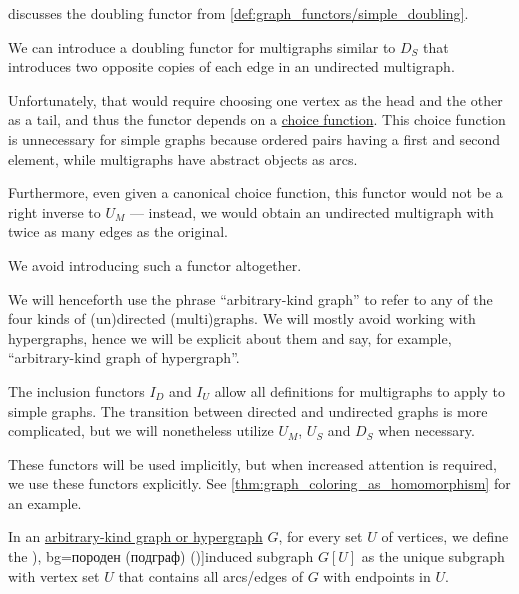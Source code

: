 \begin{comments}
  \item {} discusses the doubling functor from \cref{def:graph_functors/simple_doubling}.
  \item We can introduce a doubling functor for multigraphs similar to \hyperref[def:graph_functors/simple_doubling]{\( D_S \)} that introduces two opposite copies of each edge in an undirected multigraph.

  Unfortunately, that would require choosing one vertex as the head and the other as a tail, and thus the functor depends on a \hyperref[def:choice_function]{choice function}. This choice function is unnecessary for simple graphs because ordered pairs having a first and second element, while multigraphs have abstract objects as arcs.

  Furthermore, even given a canonical choice function, this functor would not be a right inverse to \hyperref[def:graph_functors/multi_forgetful]{\( U_M \)} --- instead, we would obtain an undirected multigraph with twice as many edges as the original.

  We avoid introducing such a functor altogether.
\end{comments}

\begin{remark}\label{rem:arbitrary_kind_graph}
  We will henceforth use the phrase \enquote{arbitrary-kind graph} to refer to any of the four kinds of (un)directed (multi)graphs. We will mostly avoid working with hypergraphs, hence we will be explicit about them and say, for example, \enquote{arbitrary-kind graph of hypergraph}.

  The inclusion functors \hyperref[def:graph_functors/directed_inclusion]{\( I_D \)} and \hyperref[def:graph_functors/undirected_inclusion]{\( I_U \)} allow all definitions for multigraphs to apply to simple graphs. The transition between directed and undirected graphs is more complicated, but we will nonetheless utilize \hyperref[def:graph_functors/multi_forgetful]{\( U_M \)}, \hyperref[def:graph_functors/simple_forgetful]{\( U_S \)} and \hyperref[def:graph_functors/simple_doubling]{\( D_S \)} when necessary.

  These functors will be used implicitly, but when increased attention is required, we use these functors explicitly. See \cref{thm:graph_coloring_as_homomorphism} for an example.
\end{remark}

\begin{definition}\label{def:induced_subgraph}
  In an \hyperref[rem:arbitrary_kind_graph]{arbitrary-kind graph or hypergraph} \( G \), for every set \( U \) of vertices, we define the \term[ru=порождённый (подграф) (\cite[17]{ЕмеличевИПр1990ТеорияГрафов}), bg=породен (подграф) (\cite[18]{Мирчев2001Графи})]{induced subgraph} \( G[U] \) as the unique subgraph with vertex set \( U \) that contains all arcs/edges of \( G \) with endpoints in \( U \).
\end{definition}

